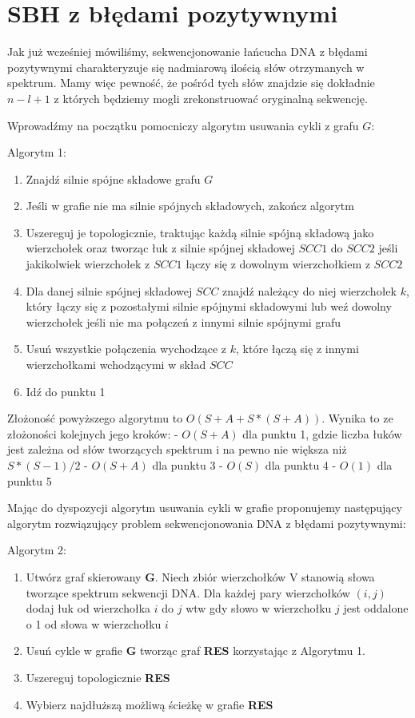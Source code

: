 \documentclass[a4paper,10pt]{article}
\begin{document}

\section{SBH z błędami pozytywnymi}
Jak już wcześniej mówiliśmy, sekwencjonowanie łańcucha DNA z błędami pozytywnymi charakteryzuje się nadmiarową ilością słów otrzymanych w spektrum. Mamy więc pewność, że pośród tych słów znajdzie się dokładnie $n-l+1$ z których będziemy mogli zrekonstruować oryginalną sekwencję.

Wprowadźmy na początku pomocniczy algorytm usuwania cykli z grafu $G$:

Algorytm 1:
\begin{enumerate}
 \item Znajdź silnie spójne składowe grafu $G$
 \item Jeśli w grafie nie ma silnie spójnych składowych, zakończ algorytm
 \item Uszereguj je topologicznie, traktując każdą silnie spójną składową jako wierzchołek oraz tworząc łuk z silnie spójnej składowej $SCC1$ do $SCC2$ jeśli jakikolwiek wierzchołek z $SCC1$ łączy się z dowolnym wierzchołkiem z $SCC2$
 \item Dla danej silnie spójnej składowej $SCC$ znajdź należący do niej wierzchołek $k$, który łączy się z pozostałymi silnie spójnymi składowymi lub weź dowolny wierzchołek jeśli nie ma połączeń z innymi silnie spójnymi grafu
 \item Usuń wszystkie połączenia wychodzące z $k$, które łączą się z innymi wierzchołkami wchodzącymi w skład $SCC$
 \item Idź do punktu 1
\end{enumerate}

Złożoność powyższego algorytmu to $O(S + A + S * (S + A))$. Wynika to ze złożoności kolejnych jego kroków:
- $O(S + A)$ dla punktu 1, gdzie liczba łuków jest zależna od słów tworzących spektrum i na pewno nie większa niż $S * (S-1) / 2$
- $O(S + A)$ dla punktu 3
- $O(S)$ dla punktu 4
- $O(1)$ dla punktu 5

Mając do dyspozycji algorytm usuwania cykli w grafie proponujemy następujący algorytm rozwiązujący problem sekwencjonowania DNA z błędami pozytywnymi:

Algorytm 2:
\begin{enumerate}
 \item Utwórz graf skierowany {\bf G}. Niech zbiór wierzchołków V stanowią słowa tworzące spektrum sekwencji DNA. Dla każdej pary wierzchołków $(i,j)$ dodaj łuk od wierzchołka $i$ do $j$ wtw gdy słowo w wierzchołku $j$ jest oddalone o 1 od słowa w wierzchołku $i$
 \item Usuń cykle w grafie {\bf G} tworząc graf {\bf RES} korzystając z Algorytmu 1.
 \item Uszereguj topologicznie {\bf RES}
 \item Wybierz najdłuższą możliwą ścieżkę w grafie {\bf RES}
\end{enumerate}
\end{document}
